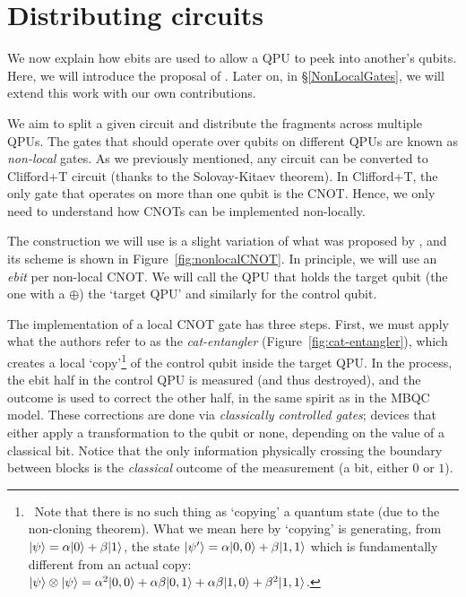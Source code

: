 \section{Distributing circuits}
\label{IntroDistributing}

We now explain how ebits are used to allow a QPU to peek into another's qubits. Here, we will introduce the proposal of \citet{NonLocalCNOT}. Later on, in \S\ref{NonLocalGates}, we will extend this work with our own contributions. 

We aim to split a given circuit and distribute the fragments across multiple QPUs. The gates that should operate over qubits on different QPUs are known as \textit{non-local} gates. As we previously mentioned, any circuit can be converted to Clifford+T circuit (thanks to the Solovay-Kitaev theorem). In Clifford+T, the only gate that operates on more than one qubit is the CNOT. Hence, we only need to understand how CNOTs can be implemented non-locally.

The construction we will use is a slight variation of what was proposed by \citet{NonLocalCNOT}, and its scheme is shown in Figure~\ref{fig:nonlocalCNOT}. In principle, we will use an \textit{ebit} per non-local CNOT. We will call the QPU that holds the target qubit (the one with a \(\oplus\)) the `target QPU' and similarly for the control qubit. 



The implementation of a local CNOT gate has three steps. First, we must apply what the authors refer to as the \textit{cat-entangler} (Figure~\ref{fig:cat-entangler}), which creates a local `copy'\footnote{\, Note that there is no such thing as `copying' a quantum state (due to the non-cloning theorem). What we mean here by `copying' is generating, from \(\vert \psi \rangle = \alpha\vert 0 \rangle + \beta\vert 1 \rangle\), the state \(\vert \psi' \rangle = \alpha\vert 0,0 \rangle + \beta\vert 1,1 \rangle\) which is fundamentally different from an actual copy: \(\vert \psi \rangle\otimes\vert \psi \rangle = \alpha^2\vert 0,0 \rangle + \alpha\beta\vert 0,1 \rangle + \alpha\beta\vert 1,0 \rangle + \beta^2\vert 1,1 \rangle\).} of the control qubit inside the target QPU. In the process, the ebit half in the control QPU is measured (and thus destroyed), and the outcome is used to correct the other half, in the same spirit as in the MBQC model. These corrections are done via \textit{classically controlled gates}; devices that either apply a transformation to the qubit or none, depending on the value of a classical bit. Notice that the only information physically crossing the boundary between blocks is the \textit{classical} outcome of the measurement (a bit, either \(0\) or \(1\)).

